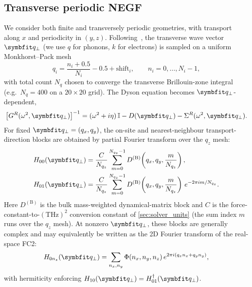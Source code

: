 \subsection{Transverse periodic NEGF}
\label{sub:transper_negf}

We consider both finite and transversely periodic geometries, with
transport along $x$ and periodicity in $(y,z)$. Following~\cite{tian_enhancing_2012,zhang_simulation_2007,guo_quantum_2020},
the transverse wave vector
$\qp$ (we use $q$ for phonons, $k$ for electrons) is sampled on a uniform
Monkhorst--Pack mesh
\begin{equation}
  q_i = \frac{n_i + 0.5}{N_i} - 0.5 + \mathrm{shift}_i,
  \qquad n_i = 0,\ldots,N_i-1,
\end{equation}
with total count $N_q$ chosen to converge the transverse Brillouin-zone
integral (e.g.\ $N_q=400$ on a $20\times 20$ grid). The Dyson equation
becomes $\qp$-dependent,
\begin{equation}\label{eq:dyson_qp}
  \bigl[G^R(\omega^2,\qp)\bigr]^{-1}
  = (\omega^2 + i\eta)\,\mathbb{I}
    - D(\qp)
    - \Sigma^R(\omega^2,\qp).
\end{equation}
For fixed $\qp = (q_x,q_y)$, the on-site and nearest-neighbour
transport-direction blocks are obtained by partial Fourier transform
over the $q_z$ mesh:
\begin{align}
  H_{00}(\qp)
    &= \frac{C}{N_{q_z}}
       \sum_{m=0}^{N_{q_z}-1}
       D^{(\mathrm{B})}\!\left(q_x,q_y,\frac{m}{N_{q_z}}\right),
  \label{eq:H00}\\
  H_{01}(\qp)
    &= \frac{C}{N_{q_z}}
       \sum_{m=0}^{N_{q_z}-1}
       D^{(\mathrm{B})}\!\left(q_x,q_y,\frac{m}{N_{q_z}}\right)\,
       e^{-2\pi i m / N_{q_z}}.
  \label{eq:H01}
\end{align}
Here $D^{(\mathrm{B})}$ is the bulk mass-weighted dynamical-matrix block and
$C$ is the force-constant-to-$(\text{THz})^2$ conversion constant of
\cref{sec:solver_units} (the sum index $m$ runs over the $q_z$ mesh).
At nonzero $\qp$, these blocks are generally complex and may equivalently
be written as the 2D Fourier transform of the real-space FC2:
\begin{equation}
  H_{0n_z}(\qp)
  = \sum_{n_x,n_y}
    \Phi(n_x,n_y,n_z)\,e^{2\pi i(q_x n_x + q_y n_y)},
\end{equation}
with hermiticity enforcing $H_{10}(\qp) = H_{01}^\dagger(\qp)$.

